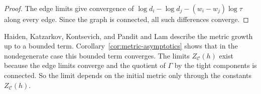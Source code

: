 \begin{proof}
The edge limits give convergence of
$\log d_i-\log d_j-(w_i-w_j)\log\tau$ along every edge. Since the graph is
connected, all such differences converge.
\end{proof}

Haiden, Katzarkov, Kontsevich, and Pandit \cite[Theorem~1.1]{HKKP2018} and
Lam \cite[Theorem~1.1]{Lam2026} describe the metric growth up to a bounded
term. Corollary~\ref{cor:metric-asymptotics} shows that in the
nondegenerate case this bounded term converges. The limits
$Z_{\mathcal C}(h)$ exist because the edge limits converge and the quotient
of $\Gamma$ by the tight components is connected. So the limit depends on the
initial metric only through the constants $Z_{\mathcal C}(h)$.
